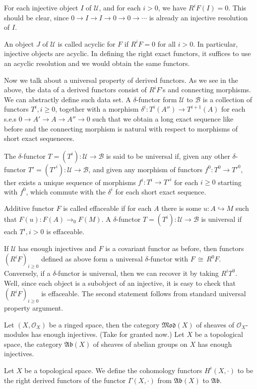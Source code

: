\documentclass[12pt]{article}
\theoremstyle{plain}
\theoremstyle{definition}
\newcommand{\sB}{\mathcal{B}}
\newcommand{\sU}{\mathcal{U}}
\newcommand{\sO}{\mathcal{O}}
\newcommand\iso{{\, \cong \,}}
\newcommand{\<}{\langle}
\renewcommand{\>}{\rangle}
\newcommand{\into}{\hookrightarrow}
\newcommand{\Mod}{\mathfrak{Mod}}
\newcommand{\Ab}{\mathfrak{Ab}}
\begin{document}
For each injective object $I$ of $\sU$, and for each $i > 0$, we have $R^i F (I) = 0$. This should be clear, since $0 \to I \to I \to 0 \to 0 \to \cdots $ is already an injective resolution of $I$. 

An object $J$ of $\sU$ is called acyclic for $F$ if $R^i F = 0 $ for all $i > 0$. In particular, injective objects are acyclic. In defining the right exact functors, it suffices to use an acyclic resolution and we would obtain the same functors. 

Now we talk about a universal property of derived functors. As we see in the above, the data of a derived functors consist of $R^i F$'s and connecting morphisms. We can abstractly define such data set. A $\delta$-functor form $\sU$ to $\sB$ is a collection of functors $T^i, i \ge 0$, together with a morphism $\delta^i : T^i(A'') \to T^{i + 1}(A)$ for each s.e.s $0 \to A' \to A \to A'' \to 0$ such that we obtain a long exact sequence like before and the connecting morphism is natural with respect to morphisms of short exact sequeneces. 

The $\delta$-functor $T = (T^i) : \sU \to \sB$ is said to be universal if, given any other $\delta$-functor $T' = (T'^i) : \sU \to \sB$, and given any morphism of functors $f^0 : T^0 \to T'^0$, ther exists a unique sequence of morphisms $f^i : T^i \to T'^i$ for each $i \ge 0$ starting with $f^0$, which commute with the $\delta^i$ for each short exact sequence. 

Additive functor $F$ is called effaceable if for each $A$ there is some $u : A \into M$ such that $F(u) : F(A) \to_0 F(M)$. A $\delta$-functor $T = (T^i) : \sU \to \sB$ is universal if each $T^i, i > 0$ is effaceable. 

If $\sU$ has enough injectives and $F$ is a covariant functor as before, then functors $ (R^i F)_{i \ge 0} $ defined as above form a universal $\delta$-functor with $F \iso R^0 F$. Conversely, if a $\delta$-functor is universal, then we can recover it by taking $R^i T^0$. Well, since each object is a subobject of an injective, it is easy to check that $ (R^i F)_{i \ge 0} $ is effaceable. The second statement follows from standard universal property argument. 

Let $(X, \sO_X)$ be a ringed space, then the category $\Mod(X)$ of sheaves of $\sO_X$-modules has enough injectives. (Take for granted now.) Let $X$ be a topological space, the category $\Ab(X)$ of sheaves of abelian groups on $X$ has enough injectives. 

Let $X$ be a topological space. We define the cohomology functors $H^i(X, \cdot)$ to be the right derived functors of the functor $\Gamma(X, \cdot)$ from $\Ab(X)$ to $\Ab$. 
\end{document}
